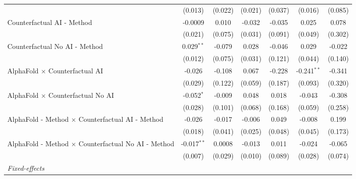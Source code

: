 \begin{tabular}{lcccccc}
                                                              & (0.013)       & (0.022)       & (0.021)      & (0.037)      & (0.016)       & (0.085)\\   
   Counterfactual AI - Method                                 & -0.0009       & 0.010         & -0.032       & -0.035       & 0.025         & 0.078\\   
                                                              & (0.021)       & (0.075)       & (0.031)      & (0.091)      & (0.049)       & (0.302)\\   
   Counterfactual No AI - Method                              & 0.029$^{**}$  & -0.079        & 0.028        & -0.046       & 0.029         & -0.022\\   
                                                              & (0.012)       & (0.075)       & (0.031)      & (0.121)      & (0.044)       & (0.140)\\   
   AlphaFold $\times$ Counterfactual AI                       & -0.026        & -0.108        & 0.067        & -0.228       & -0.241$^{**}$ & -0.341\\   
                                                              & (0.029)       & (0.122)       & (0.059)      & (0.187)      & (0.093)       & (0.320)\\   
   AlphaFold $\times$ Counterfactual No AI                    & -0.052$^{*}$  & -0.009        & 0.048        & 0.018        & -0.043        & -0.308\\   
                                                              & (0.028)       & (0.101)       & (0.068)      & (0.168)      & (0.059)       & (0.258)\\   
   AlphaFold - Method $\times$ Counterfactual AI - Method     & -0.026        & -0.017        & -0.006       & 0.049        & -0.008        & 0.199\\   
                                                              & (0.018)       & (0.041)       & (0.025)      & (0.048)      & (0.045)       & (0.173)\\   
   AlphaFold - Method $\times$ Counterfactual No AI - Method  & -0.017$^{**}$ & 0.0008        & -0.013       & 0.011        & -0.024        & -0.065\\   
                                                              & (0.007)       & (0.029)       & (0.010)      & (0.089)      & (0.028)       & (0.074)\\   
   \midrule
   \emph{Fixed-effects}\\

\end{tabular}
